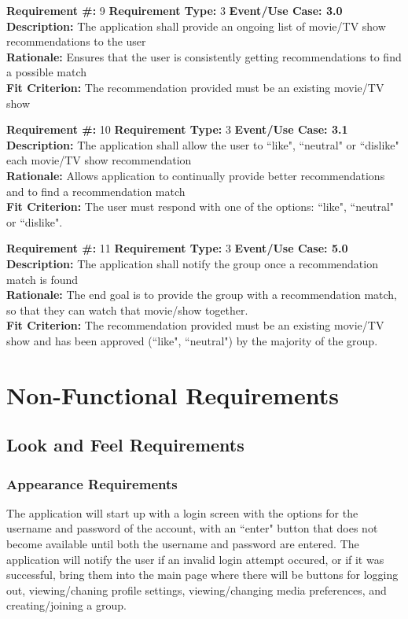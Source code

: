 \documentclass[12pt]{article}
\begin{document}
\textbf{Requirement \#:} 9 \quad \textbf{Requirement Type:} 3 \quad \textbf{Event/Use Case: 3.0}
\medskip
\\\textbf{Description:} The application shall provide an ongoing list of movie/TV show recommendations to the user
\\\textbf{Rationale:} Ensures that the user is consistently getting recommendations to find a possible match
\\\textbf{Fit Criterion:} The recommendation provided must be an existing movie/TV show

\bigskip
\textbf{Requirement \#:} 10 \quad \textbf{Requirement Type:} 3 \quad \textbf{Event/Use Case: 3.1}
\medskip
\\\textbf{Description:} The application shall allow the user to ``like", ``neutral" or ``dislike" each movie/TV show recommendation
\\\textbf{Rationale:} Allows application to continually provide better recommendations and to find a recommendation match
\\\textbf{Fit Criterion:} The user must respond with one of the options: ``like", ``neutral" or ``dislike".

\bigskip
\textbf{Requirement \#:} 11 \quad \textbf{Requirement Type:} 3 \quad \textbf{Event/Use Case: 5.0}
\medskip
\\\textbf{Description:} The application shall notify the group once a recommendation match is found
\\\textbf{Rationale:} The end goal is to provide the group with a recommendation match, so that they can watch that movie/show together.
\\\textbf{Fit Criterion:} The recommendation provided must be an existing movie/TV show and has been approved (``like", ``neutral") by the majority of the group. 


\section{Non-Functional Requirements}


\subsection{Look and Feel Requirements}


\subsubsection{Appearance Requirements}
The application will start up with a login screen with the options for the username and password of the account, with an ``enter" button that does not become available until both the username and password are entered. 
The application will notify the user if an invalid login attempt occured, or if it was successful, bring them into the main page where there will be buttons for logging out, viewing/chaning profile settings, viewing/changing 
media preferences, and creating/joining a group.
\end{document}
